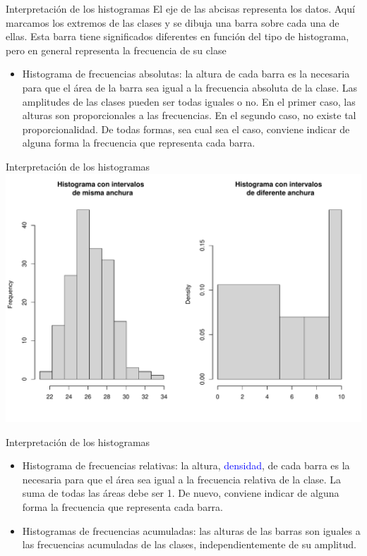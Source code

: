 \documentclass[
  ignorenonframetext,
]{beamer}
\providecommand{\tightlist}{%
  \setlength{\itemsep}{0pt}\setlength{\parskip}{0pt}}
\newcommand\blue[1]{\textcolor{blue}{#1}}
\begin{document}
\begin{frame}{Interpretación de los histogramas}
\label{interpretaciuxf3n-de-los-histogramas}
El eje de las abcisas representa los datos. Aquí marcamos los extremos
de las clases y se dibuja una barra sobre cada una de ellas. Esta barra
tiene significados diferentes en función del tipo de histograma, pero en
general representa la frecuencia de su clase

\begin{itemize}
\tightlist
\item
  Histograma de frecuencias absolutas: la altura de cada barra es la
  necesaria para que el área de la barra sea igual a la frecuencia
  absoluta de la clase. Las amplitudes de las clases pueden ser todas
  iguales o no. En el primer caso, las alturas son proporcionales a las
  frecuencias. En el segundo caso, no existe tal proporcionalidad. De
  todas formas, sea cual sea el caso, conviene indicar de alguna forma
  la frecuencia que representa cada barra.
\end{itemize}
\end{frame}

\begin{frame}{Interpretación de los histogramas}
\label{interpretaciuxf3n-de-los-histogramas-1}
\includegraphics{R_base_files/figure-beamer/unnamed-chunk-235-1.pdf}
\end{frame}

\begin{frame}{Interpretación de los histogramas}
\label{interpretaciuxf3n-de-los-histogramas-2}
\begin{itemize}
\tightlist
\item
  Histograma de frecuencias relativas: la altura, \blue{densidad}, de
  cada barra es la necesaria para que el área sea igual a la frecuencia
  relativa de la clase. La suma de todas las áreas debe ser 1. De nuevo,
  conviene indicar de alguna forma la frecuencia que representa cada
  barra.
\item
  Histogramas de frecuencias acumuladas: las alturas de las barras son
  iguales a las frecuencias acumuladas de las clases, independientemente
  de su amplitud.
\end{itemize}
\end{frame}
\end{document}
